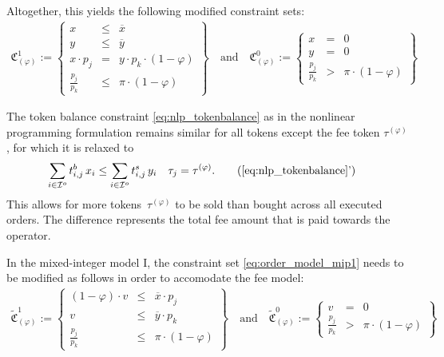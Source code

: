 \documentclass[11pt,parskip=full]{scrartcl}%
\newcommand*{\iorders}{\mathcal{I}^o}       %
\begin{document}
Altogether, this yields the following modified constraint sets:
\begin{align}
  \mathfrak{C}^1_{(\varphi)} := \left\{
  \begin{array}{rll}
    x &\le & \overline{x} \\
    y &\le & \overline{y} \\
    x \cdot p_j &= & y \cdot p_k \cdot (1-\varphi) \\[1mm]
    \frac{p_j}{p_k} &\le & \pi \cdot (1-\varphi)
  \end{array}
  \right\}
  \quad
  \text{and}
  \quad
  \mathfrak{C}^0_{(\varphi)} := \left\{
  \begin{array}{rll}
    x &= & 0 \\
    y &= & 0 \\[1mm]
    \frac{p_j}{p_k} &> & \pi \cdot (1-\varphi)
  \end{array}
  \right\}
  \label{eq:order_model_generic_fee}
\end{align}

The token balance constraint \eqref{eq:nlp_tokenbalance} as in the nonlinear programming formulation remains similar for all tokens except the fee token $\tau^{(\varphi)}$, for which it is relaxed to
\begin{align}
  \sum\limits_{i \in \iorders} t^b_{i,j} \, x_i
  &\le \sum\limits_{i \in \iorders} t^s_{i,j} \, y_i
  && \tau_j = \tau^{(\varphi)}.
  \tag{\ref{eq:nlp_tokenbalance}'}
\end{align}
This allows for more tokens~$\tau^{(\varphi)}$ to be sold than bought across all executed orders.
The difference represents the total fee amount that is paid towards the operator.

In the mixed-integer model I, the constraint set \eqref{eq:order_model_mip1} needs to be modified as follows in order to accomodate the fee model:
\begin{align}
  \tilde{\mathfrak{C}}^1_{(\varphi)} := \left\{
  \begin{array}{rlll}
    (1-\varphi) \cdot v &\le & \overline{x} \cdot p_j \\
    v &\le & \overline{y} \cdot p_k \\[1mm]
    \frac{p_j}{p_k} &\le & \pi \cdot (1-\varphi)
  \end{array}
  \right\}
  \quad
  \text{and}
  \quad
  \tilde{\mathfrak{C}}^0_{(\varphi)} := \left\{
  \begin{array}{rll}
    v &= & 0 \\[1mm]
    \frac{p_j}{p_k} &> & \pi \cdot (1-\varphi)
  \end{array}
  \right\}
  \label{eq:order_model_mip1_fee}
\end{align}
\end{document}
